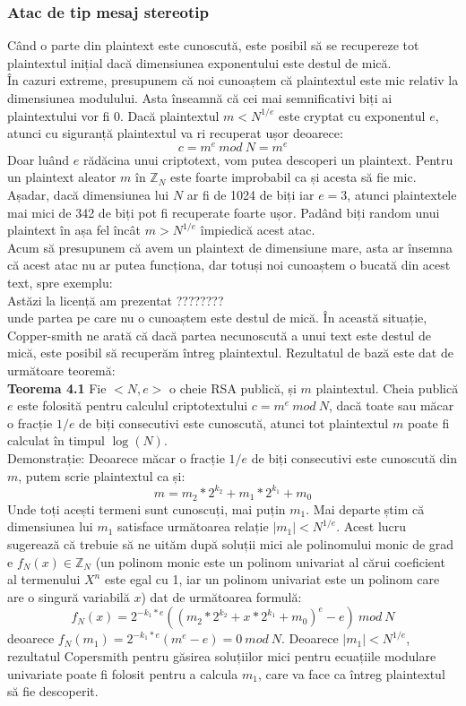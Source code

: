 \documentclass[12]{article}
\begin{document}
\subsubsection{Atac de tip mesaj stereotip}
Când o parte din plaintext este cunoscută, este posibil să se recupereze tot plaintextul inițial dacă dimensiunea exponentului este destul de mică. \\
În cazuri extreme, presupunem că noi cunoaștem că plaintextul este mic relativ la dimensiunea modulului. Asta înseamnă că cei mai semnificativi biți ai plaintextului vor fi 0. Dacă plaintextul $m < N^{1/e}$ este cryptat cu exponentul $e$, atunci cu siguranță plaintextul va ri recuperat ușor deoarece:
$$ c = m^e \ mod \ N = m^e$$
Doar luând $e$ rădăcina unui criptotext, vom putea descoperi un plaintext. Pentru un plaintext aleator $m$ în $\mathbb{Z}_N$ este foarte improbabil ca și acesta să fie mic. \\
Așadar, dacă dimensiunea lui $N$ ar fi de 1024 de biți iar $e=3$, atunci plaintextele mai mici de 342 de biți pot fi recuperate foarte ușor. Padând biți random unui plaintext în așa fel încât $m > N^{1/e}$ împiedică acest atac. \\
Acum să presupunem că avem un plaintext de dimensiune mare, asta ar însemna că acest atac nu ar putea funcționa, dar totuși noi cunoaștem o bucată din acest text, spre exemplu: \\
Astăzi la licență am prezentat ???????? \\
unde partea pe care nu o cunoaștem este destul de mică. În această situație, Copper-smith \cite{cooper} \cite{cooper2} ne arată că dacă partea necunoscută a unui text este destul de mică, este posibil să recuperăm întreg plaintextul. Rezultatul de bază este dat de următoare teoremă: \\
\textbf{Teorema 4.1}
Fie $<N,e>$ o cheie RSA publică, și $m$ plaintextul. Cheia publică $e$ este folosită pentru calculul criptotextului $c = m^e \ mod \ N$, dacă toate sau măcar o fracție $1/e$ de biți consecutivi este cunoscută, atunci tot plaintextul $m$ poate fi calculat în timpul $\log(N)$. \\
Demonstrație: Deoarece măcar o fracție $1/e$ de biți consecutivi este cunoscută din $m$, putem scrie plaintextul ca și:
$$ m= m_{2}^{} * 2^{k_2} + m_1 * 2^{k_1} + m_0$$
Unde toți acești termeni sunt cunoscuți, mai puțin $m_1$. Mai departe știm  că dimensiunea lui $m_1$ satisface următoarea relație $ |m_1| < N^{1/e}$. Acest lucru sugerează că trebuie să ne uităm după soluții mici ale polinomului monic de grad e $f_N(x) \in \mathbb{Z}_N $ (un polinom monic este un polinom univariat al cărui coeficient al termenului $X^n$ este egal cu 1, iar un polinom univariat este un polinom care are o singură variabilă $x$) dat de următoarea formulă:
$$ f_N(x) = 2^{-k_1 * e}((m_2 * 2^{k_2} + x*2^{k_1} + m_0)^e - e) \ mod \ N$$
deoarece $f_N(m_1)= 2^{-k_1 *e}(m^e-e)=0 \ mod \ N$. Deoarece $ |m_1| < N^{1/e}$, rezultatul Copersmith pentru găsirea soluțiilor mici pentru ecuațiile modulare univariate poate fi folosit pentru a calcula $m_1$, care va face ca întreg plaintextul să fie descoperit. 
\end{document}
